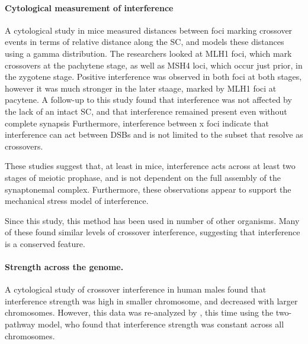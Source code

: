 \paragraph{Cytological measurement of interference}
A cytological study in mice measured distances between foci marking crossover events in terms of relative distance along the SC, and models these distances using a gamma distribution\cite{DeBoer2006a}.
The researchers looked at MLH1 foci, which mark crossovers at the pachytene stage, as well as MSH4 loci, which occur just prior, in the zygotene stage.
Positive interference was observed in both foci at both stages, however it was much stronger in the later staage, marked by MLH1 foci at pacytene.
A follow-up to this study found that interference was not affected by the lack of an intact SC, and that interference remained present even without complete synapsis\cite{DeBoer2007}
Furthermore, interference between x foci indicate that interference can act between DSBs and is not limited to the subset that resolve as crossovers\cite{Baudat2007}.

These studies suggest that, at least in mice, interference acts across at least two stages of meiotic prophase, and is not dependent on the full assembly of the synaptonemal complex.
Furthermore, these observations appear to support the mechanical stress model of interference.

Since this study, this method has been used in number of other organisms\cite{Barchi2008,Basheva2008}.
%
Many of these found similar levels of crossover interference, suggesting that interference is a conserved feature.

\paragraph{Strength across the genome.}
A cytological study of crossover interference in human males\cite{Lian2008} found that interference strength was high in smaller chromosome, and decreased with larger chromosomes.
However, this data was re-analyzed by \citet{Housworth2009}, this time using the two-pathway model, who found that interference strength was constant across all chromosomes.



